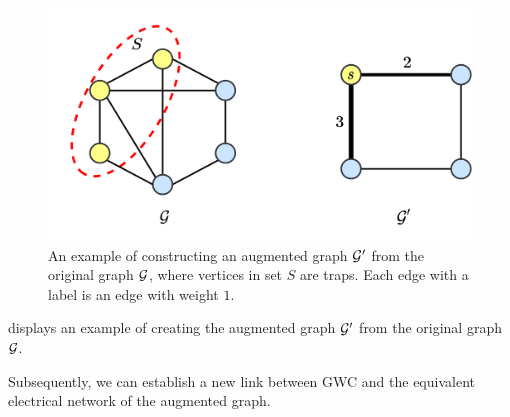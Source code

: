 \documentclass[10pt,twocolumn,twoside]{IEEEtran}
\begin{document}
\begin{figure}[!t]
    \centering
    \includegraphics[width=0.9\linewidth]{augmented_graph.png}
    \caption{An example of constructing an augmented graph \(\mathcal{G}'\) from the original graph \(\mathcal{G}\), where  vertices in set $S$ are traps. Each edge with a label is an edge with  weight \(1\).}
    \label{fig:augmented-graph}
\end{figure}

 displays an example of creating the augmented graph \(\mathcal{G}'\) from the original graph \(\mathcal{G}\).

Subsequently, we can establish a new link between GWC and the equivalent electrical network of the augmented graph.
\end{document}

